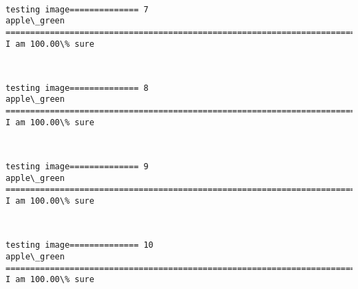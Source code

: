 \documentclass[11pt]{article}
\begin{document}
    \begin{center}
    \end{center}
    { \hspace*{\fill} \\}
    
    \begin{Verbatim}[commandchars=\\\{\}]
testing image============== 7
apple\_green
============================================================================
I am 100.00\% sure

    \end{Verbatim}

    \begin{center}
    \end{center}
    { \hspace*{\fill} \\}
    
    \begin{Verbatim}[commandchars=\\\{\}]
testing image============== 8
apple\_green
============================================================================
I am 100.00\% sure

    \end{Verbatim}

    \begin{center}
    \end{center}
    { \hspace*{\fill} \\}
    
    \begin{Verbatim}[commandchars=\\\{\}]
testing image============== 9
apple\_green
============================================================================
I am 100.00\% sure

    \end{Verbatim}

    \begin{center}
    \end{center}
    { \hspace*{\fill} \\}
    
    \begin{Verbatim}[commandchars=\\\{\}]
testing image============== 10
apple\_green
============================================================================
I am 100.00\% sure

    \end{Verbatim}
\end{document}
